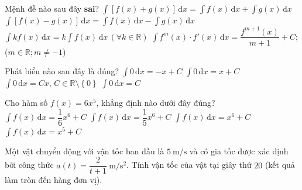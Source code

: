 \begin{ex}%
	Mệnh đề nào sau  đây {\bf sai}?
	\choice 
		{$\displaystyle\int[f(x)+g(x)]\mathrm{\,d}x  = \int f(x)\mathrm{\,d}x+\int g(x)\mathrm{\,d}x$}
		{$\displaystyle\int[f(x)-g(x)]\mathrm{\,d}x = \int  f(x)\mathrm{\,d}x-\int g(x)\mathrm{\,d}x$}
		{\True $\displaystyle\int k f(x)\mathrm{\,d}x = k\int f(x)\mathrm{\,d}x \,(\forall k \in \mathbb{R})$} 
		{$\displaystyle\int f^m(x)\cdot f'(x)\mathrm{\,d}x  = \dfrac{f^{m+1}(x)}{m+1}+C$; ($m \in \mathbb{R}; m \ne -1$)}
\end{ex}

\begin{ex}%
	Phát biểu nào sau  đây là đúng?
	\choice 
		{$\displaystyle\int 0 \mathrm{\,d}x =  -x+C$}
		{$\displaystyle\int 0 \mathrm{\,d}x  =x+ C$}
		 {$\displaystyle\int 0 \mathrm{\,d}x = Cx,\, C\in \mathbb{R}\setminus \left\lbrace 0\right\rbrace $}
		 {\True $\displaystyle\int 0 \mathrm{\,d}x = C$}
\end{ex}

\begin{ex}%
	Cho hàm số $f(x)=6 x^{5}$,  khẳng định nào dưới đây đúng?
	\choice 
		{$\displaystyle\int  f(x) \mathrm{\,d} x=\dfrac{1}{6} x^{6}+C$}
		 {$\displaystyle\int f(x) \mathrm{\,d} x=\dfrac{1}{5} x^{6}+C$}
		{\True $\displaystyle\int f(x) \mathrm{\,d}  x=x^{6}+C$}
		{$\displaystyle\int f(x) \mathrm{\,d} x=x^{5}+C$} 
\end{ex}

\begin{bt}%
	Một  vật chuyển động với vận tốc ban đầu là $5~\mathrm{m/s}$ và có gia tốc được xác định bởi công thức $a(t)=\dfrac{2}{t+1}~\mathrm{m/s^2} $. Tính vận tốc của vật tại giây thứ $20$ (kết quả làm tròn đến hàng đơn vị).
\end{bt}

